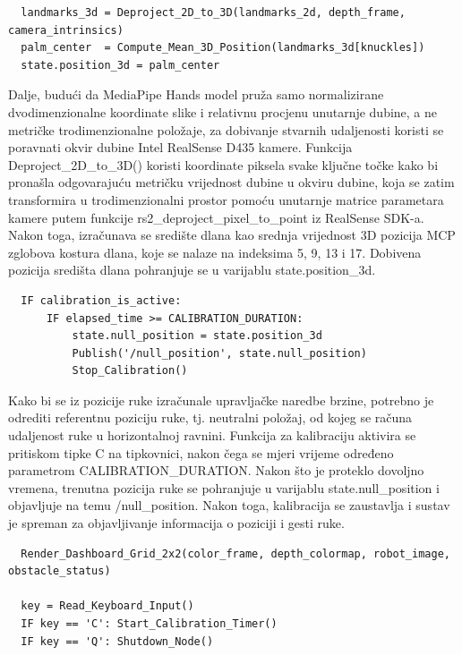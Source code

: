 \documentclass[12pt,a4paper,oneside]{report}
\begin{document}
\begin{verbatim}
  landmarks_3d = Deproject_2D_to_3D(landmarks_2d, depth_frame, camera_intrinsics)
  palm_center  = Compute_Mean_3D_Position(landmarks_3d[knuckles])
  state.position_3d = palm_center
\end{verbatim}

Dalje, budući da MediaPipe Hands model pruža samo normalizirane dvodimenzionalne koordinate slike i 
relativnu procjenu unutarnje dubine, a ne metričke trodimenzionalne položaje, za dobivanje stvarnih 
udaljenosti koristi se poravnati okvir dubine Intel RealSense D435 kamere. Funkcija Deproject\_2D\_to\_3D() 
koristi koordinate piksela svake ključne točke kako bi pronašla odgovarajuću metričku vrijednost dubine u 
okviru dubine, koja se zatim transformira u trodimenzionalni prostor pomoću unutarnje matrice parametara 
kamere putem funkcije rs2\_deproject\_pixel\_to\_point iz RealSense SDK-a.
Nakon toga, izračunava se središte dlana kao srednja vrijednost 3D pozicija MCP zglobova 
kostura dlana, koje se nalaze na indeksima 5, 9, 13 i 17. Dobivena pozicija središta dlana pohranjuje se u 
varijablu state.position\_3d. 

\begin{verbatim}
  IF calibration_is_active:
      IF elapsed_time >= CALIBRATION_DURATION:
          state.null_position = state.position_3d
          Publish('/null_position', state.null_position)
          Stop_Calibration()
\end{verbatim}

Kako bi se iz pozicije ruke izračunale upravljačke naredbe brzine, potrebno je odrediti referentnu poziciju 
ruke, tj. neutralni položaj, od kojeg se računa udaljenost ruke u horizontalnoj ravnini. 
Funkcija za kalibraciju aktivira se pritiskom tipke C na tipkovnici, nakon čega se mjeri vrijeme određeno 
parametrom CALIBRATION\_DURATION. Nakon što je proteklo dovoljno vremena, trenutna pozicija ruke se pohranjuje 
u varijablu state.null\_position i objavljuje na temu /null\_position. Nakon toga, kalibracija se zaustavlja 
i sustav je spreman za objavljivanje informacija o poziciji i gesti ruke. 

\begin{verbatim}
  Render_Dashboard_Grid_2x2(color_frame, depth_colormap, robot_image, obstacle_status)
      
  key = Read_Keyboard_Input()
  IF key == 'C': Start_Calibration_Timer()
  IF key == 'Q': Shutdown_Node()
\end{verbatim}
\end{document}
